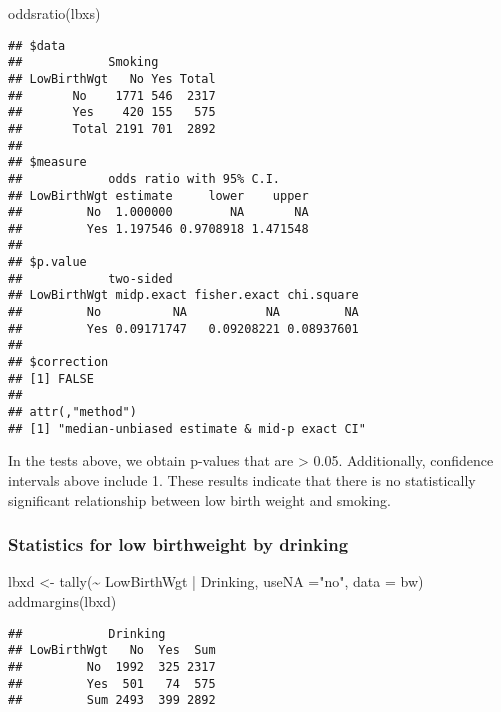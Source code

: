 \documentclass[
]{article}
\newenvironment{Shaded}{\begin{snugshade}}{\end{snugshade}}
\newcommand{\AttributeTok}[1]{\textcolor[rgb]{0.77,0.63,0.00}{#1}}
\newcommand{\FunctionTok}[1]{\textcolor[rgb]{0.00,0.00,0.00}{#1}}
\newcommand{\NormalTok}[1]{#1}
\newcommand{\OtherTok}[1]{\textcolor[rgb]{0.56,0.35,0.01}{#1}}
\newcommand{\SpecialCharTok}[1]{\textcolor[rgb]{0.00,0.00,0.00}{#1}}
\newcommand{\StringTok}[1]{\textcolor[rgb]{0.31,0.60,0.02}{#1}}
\begin{document}
\begin{Shaded}
\begin{Highlighting}[]
\FunctionTok{oddsratio}\NormalTok{(lbxs)}
\end{Highlighting}
\end{Shaded}

\begin{verbatim}
## $data
##            Smoking
## LowBirthWgt   No Yes Total
##       No    1771 546  2317
##       Yes    420 155   575
##       Total 2191 701  2892
## 
## $measure
##            odds ratio with 95% C.I.
## LowBirthWgt estimate     lower    upper
##         No  1.000000        NA       NA
##         Yes 1.197546 0.9708918 1.471548
## 
## $p.value
##            two-sided
## LowBirthWgt midp.exact fisher.exact chi.square
##         No          NA           NA         NA
##         Yes 0.09171747   0.09208221 0.08937601
## 
## $correction
## [1] FALSE
## 
## attr(,"method")
## [1] "median-unbiased estimate & mid-p exact CI"
\end{verbatim}

In the tests above, we obtain p-values that are \textgreater{} 0.05.
Additionally, confidence intervals above include 1. These results
indicate that there is no statistically significant relationship between
low birth weight and smoking.

\hypertarget{statistics-for-low-birthweight-by-drinking}{%
\subsubsection{Statistics for low birthweight by
drinking}\label{statistics-for-low-birthweight-by-drinking}}

\begin{Shaded}
\begin{Highlighting}[]
\NormalTok{lbxd }\OtherTok{\textless{}{-}} \FunctionTok{tally}\NormalTok{(}\SpecialCharTok{\textasciitilde{}}\NormalTok{ LowBirthWgt }\SpecialCharTok{|}\NormalTok{ Drinking, }\AttributeTok{useNA =}\StringTok{"no"}\NormalTok{, }\AttributeTok{data =}\NormalTok{ bw)}
\FunctionTok{addmargins}\NormalTok{(lbxd)}
\end{Highlighting}
\end{Shaded}

\begin{verbatim}
##            Drinking
## LowBirthWgt   No  Yes  Sum
##         No  1992  325 2317
##         Yes  501   74  575
##         Sum 2493  399 2892
\end{verbatim}
\end{document}
